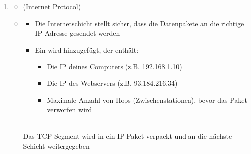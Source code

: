 \begin{infoBox}[title=Das Beispiel: Aufruf einer Webseite]
\begin{enumerate}
\begin{itemize}
\begin{itemize}
                \begin{itemize}
                    \item {} (z.B. 51000): Temporärer Port deines Computers
                    \item {} (443): HTTPS-Port des Servers
                    \item {} Zum Zusammensetzen der Daten in der richtigen Reihenfolge
                    \item {} Prüft die Integrität der Daten
                \end{itemize}
            \end{itemize}
            \\
            Das HTTP-Request-Payload wird in ein TCP-Segment verpackt und an die nächste Schicht weitergeleitet
        \end{itemize}
        \item {}
        \begin{itemize}
            \item {} (Internet Protocol)
            \item {}
            \begin{itemize}
                \item Die Internetschicht stellt sicher, dass die Datenpakete an die richtige IP-Adresse gesendet werden
                \item Ein  wird hinzugefügt, der enthält:
                \begin{itemize}
                    \item {} Die IP deines Computers (z.B. 192.168.1.10)
                    \item {} Die IP des Webservers (z.B. 93.184.216.34)
                    \item {} Maximale Anzahl von Hops (Zwischenstationen), bevor das Paket verworfen wird
                \end{itemize}
            \end{itemize}
            \\
            Das TCP-Segment wird in ein IP-Paket verpackt und an die nächste Schicht weitergegeben
        \end{itemize}
    \end{enumerate}
\end{infoBox}
